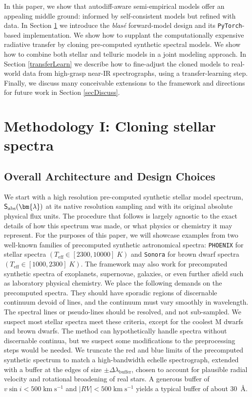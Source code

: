 \documentclass[modern]{aastex631}
\def\kmps{\mathrm{km}\;\mathrm{s}^{-1}}
\begin{document}
In this paper, we show that autodiff-aware semi-empirical models offer an appealing middle ground: informed by self-consistent models but refined with data.  In Section \ref{methodology} we introduce the \emph{blas\'e} forward-model design and its \texttt{PyTorch}-based \citep{2019arXiv191201703P} implementation.  We show how to supplant the computationally expensive radiative transfer by cloning pre-computed synthetic spectral models.  We show how to combine both stellar and telluric models in a joint modeling approach.  In Section \ref{transferLearn} we describe how to fine-adjust the cloned models to real-world data from high-grasp near-IR spectrographs, using a transfer-learning step.
Finally, we discuss many conceivable extensions to the framework and directions for future work in Section \ref{secDiscuss}.


\section{Methodology I: Cloning stellar spectra}\label{methodology}

\subsection{Overall Architecture and Design Choices}

We start with a high resolution pre-computed synthetic stellar model spectrum, $\mathsf{S}_{\rm abs}(\bm{\lambda})$ at its native resolution sampling and with its original absolute physical flux units. The procedure that follows is largely agnostic to the exact details of how this spectrum was made, or what physics or chemistry it may represent. For the purposes of this paper, we will showcase examples from two well-known families of precomputed synthetic astronomical spectra: \texttt{PHOENIX} \citep{husser13} for stellar spectra $(T_{\mathrm{eff}}\in [2300, 10000]\;K)$ and \texttt{Sonora} \citep{2021ApJ...920...85M} for brown dwarf spectra $(T_{\mathrm{eff}}\in [1000, 2300]\;K)$. The framework may also work for precomputed synthetic spectra of exoplanets, supernovae, galaxies, or even further afield such as laboratory physical chemistry.  We place the following demands on the precomputed spectra. They should have sporadic regions of discernable continuum devoid of lines, and the continuum must vary smoothly in wavelength. The spectral lines or pseudo-lines should be resolved, and not sub-sampled. We suspect most stellar spectra meet these criteria, except for the coolest M dwarfs and brown dwarfs. The method can hypothetically handle spectra without discernable continua, but we suspect some modifications to the preprocessing steps would be needed. We truncate the red and blue limits of the precomputed synthetic spectrum to match a high-bandwidth echelle spectrograph, extended with a buffer at the edges of size $\pm \Delta \lambda_{\mathrm{buffer}}$, chosen to account for plausible radial velocity and rotational broadening of real stars. A generous buffer of $v \sin{i} < 500 \;\kmps$ and $|RV|<500 \;\kmps$ yields a typical buffer of about 30~\AA.
\end{document}
